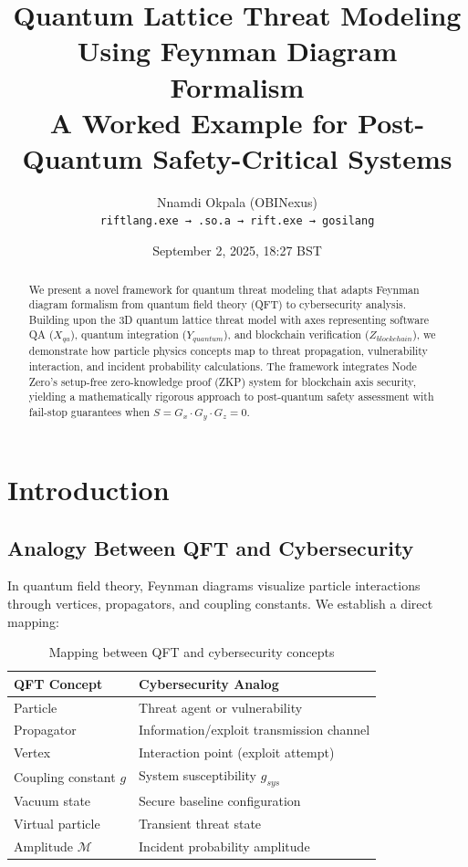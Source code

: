 \documentclass[11pt,a4paper]{article}
\title{Quantum Lattice Threat Modeling Using Feynman Diagram Formalism\\
\large A Worked Example for Post-Quantum Safety-Critical Systems}
\author{Nnamdi Okpala (OBINexus)\\
\texttt{riftlang.exe → .so.a → rift.exe → gosilang}}
\date{September 2, 2025, 18:27 BST}
\begin{document}
\maketitle

\begin{abstract}
We present a novel framework for quantum threat modeling that adapts Feynman diagram formalism from quantum field theory (QFT) to cybersecurity analysis. Building upon the 3D quantum lattice threat model with axes representing software QA ($X_{qa}$), quantum integration ($Y_{quantum}$), and blockchain verification ($Z_{blockchain}$), we demonstrate how particle physics concepts map to threat propagation, vulnerability interaction, and incident probability calculations. The framework integrates Node Zero's setup-free zero-knowledge proof (ZKP) system for blockchain axis security, yielding a mathematically rigorous approach to post-quantum safety assessment with fail-stop guarantees when $S = G_x \cdot G_y \cdot G_z = 0$.
\end{abstract}

\section{Introduction}

\subsection{Analogy Between QFT and Cybersecurity}

In quantum field theory, Feynman diagrams visualize particle interactions through vertices, propagators, and coupling constants. We establish a direct mapping:

\begin{table}[h]
\centering
\begin{tabular}{l|l}
\hline
\textbf{QFT Concept} & \textbf{Cybersecurity Analog} \\
\hline
Particle & Threat agent or vulnerability \\
Propagator & Information/exploit transmission channel \\
Vertex & Interaction point (exploit attempt) \\
Coupling constant $g$ & System susceptibility $g_{sys}$ \\
Vacuum state & Secure baseline configuration \\
Virtual particle & Transient threat state \\
Amplitude $\mathcal{M}$ & Incident probability amplitude \\
\hline
\end{tabular}
\caption{Mapping between QFT and cybersecurity concepts}
\end{table}
\end{document}

